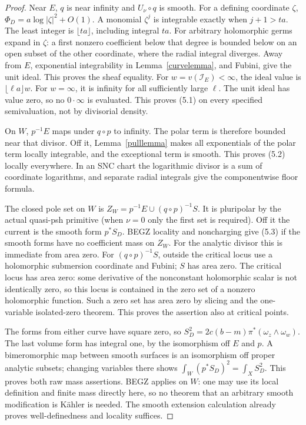 \documentclass[11pt]{article}
\theoremstyle{remark}\newtheorem{remark}[theorem]{Remark}
\begin{document}
\begin{proof}
Near $E$, $q$ is near infinity and $U_\nu\circ q$ is smooth.
For a defining coordinate $\zeta$, $\Phi_D=a\log|\zeta|^2+O(1)$.
A monomial $\zeta^j$ is integrable exactly when $j+1>ta$.
The least integer is $\lfloor ta\rfloor$, including integral $ta$.
For arbitrary holomorphic germs expand in $\zeta$: a first nonzero
coefficient below that degree is bounded below on an open subset
of the other coordinate, where the radial integral diverges.
Away from $E$, exponential integrability in
Lemma~\ref{curvelemma}, and Fubini, give the unit ideal.
This proves the sheaf equality.
For $w=v(\mathcal I_E)<\infty$, the ideal value is
$\lfloor\ell a\rfloor w$. For $w=\infty$, it is infinity for
all sufficiently large $\ell$. The unit ideal has value zero,
so no $0\cdot\infty$ is evaluated. This proves (5.1) on every
specified semivaluation, not by divisorial density.

On $W$, $p^{-1}E$ maps under $q\circ p$ to infinity.
The polar term is therefore bounded near that divisor.
Off it, Lemma~\ref{pulllemma} makes all exponentials of the
polar term locally integrable, and the exceptional term is smooth.
This proves (5.2) locally everywhere. In an SNC chart the
logarithmic divisor is a sum of coordinate logarithms, and
separate radial integrals give the componentwise floor formula.

The closed pole set on $W$ is
$Z_W=p^{-1}E\cup(q\circ p)^{-1}S$.
It is pluripolar by the actual quasi-psh primitive (when $\nu=0$
only the first set is required).
Off it the current is the smooth form $p^*S_D$.
BEGZ locality and noncharging give (5.3) if the smooth forms
have no coefficient mass on $Z_W$.
For the analytic divisor this is immediate from area zero.
For $(q\circ p)^{-1}S$, outside the critical locus use a
holomorphic submersion coordinate and Fubini; $S$ has area zero.
The critical locus has area zero: some derivative of the
nonconstant holomorphic scalar is not identically zero, so this
locus is contained in the zero set of a nonzero holomorphic function.
Such a zero set has area zero by slicing and the one-variable
isolated-zero theorem. This proves the assertion also at critical points.

The forms from either curve have square zero, so
$S_D^2=2c(b-m)\pi^*(\omega_z\wedge\omega_w)$.
The last volume form has integral one, by the isomorphism off
$E$ and $p$. A bimeromorphic map between smooth surfaces is
an isomorphism off proper analytic subsets; changing variables
there shows $\int_W(p^*S_D)^2=\int_XS_D^2$.
This proves both raw mass assertions. BEGZ applies on $W$:
one may use its local definition and finite mass directly here,
so no theorem that an arbitrary smooth modification is K\"ahler
is needed. The smooth extension calculation already proves
well-definedness and locality suffices.
\end{proof}
\end{document}

